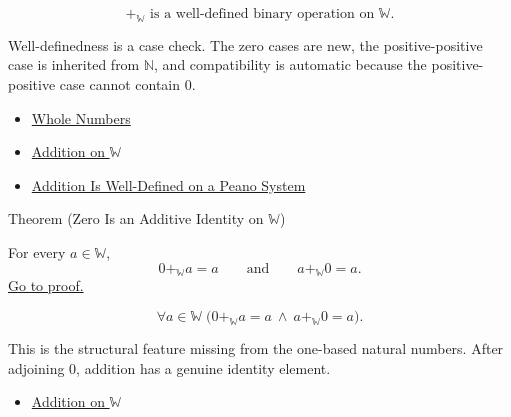 \begin{remark*}
\[
+_{\mathbb{W}}\text{ is a well-defined binary operation on }\mathbb{W}.
\]
\end{remark*}

\begin{remark*}[Interpretation]
Well-definedness is a case check. The zero cases are new, the
positive-positive case is inherited from $\mathbb{N}$, and compatibility is
automatic because the positive-positive case cannot contain $0$.
\end{remark*}

\begin{dependencies}
\begin{itemize}
  \item \hyperref[def:whole-numbers]{Whole Numbers}
  \item \hyperref[def:addition-on-w]{Addition on $\mathbb{W}$}
  \item \hyperref[thm:addition-well-defined-on-peano-system]{Addition Is Well-Defined on a Peano System}
\end{itemize}
\end{dependencies}

\begin{theorembox}{Theorem (Zero Is an Additive Identity on \texorpdfstring{$\mathbb{W}$}{W})}
\begin{theorem}
\label{thm:zero-additive-identity-on-w}
For every $a\in\mathbb{W}$,
\[
0+_{\mathbb{W}}a=a
\qquad\text{and}\qquad
a+_{\mathbb{W}}0=a.
\]
\hyperref[prf:zero-additive-identity-on-w]{Go to proof.}
\end{theorem}
\end{theorembox}

\begin{remark*}
\[
\forall a\in\mathbb{W}\;
\bigl(0+_{\mathbb{W}}a=a\ \wedge\ a+_{\mathbb{W}}0=a\bigr).
\]
\end{remark*}

\begin{remark*}[Interpretation]
This is the structural feature missing from the one-based natural numbers.
After adjoining $0$, addition has a genuine identity element.
\end{remark*}

\begin{dependencies}
\begin{itemize}
  \item \hyperref[def:addition-on-w]{Addition on $\mathbb{W}$}
\end{itemize}
\end{dependencies}

